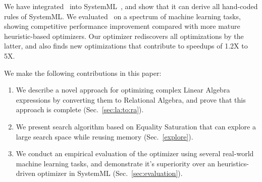 We have integrated \sys\ into
SystemML~\cite{DBLP:reference/bdt/Boehm19}, and show that it can
derive all hand-coded rules of SystemML.  We evaluated \sys\ on a
spectrum of machine learning tasks, showing competitive performance
improvement compared with more mature heuristic-based optimizers. Our
optimizer rediscovers all optimizations by the latter, and also finds
new optimizations that contribute to speedups of 1.2X to 5X.

We make the following contributions in this paper:
\begin{enumerate}
\item We describe a novel approach for optimizing complex Linear
  Algebra expressions by converting them to Relational Algebra, and
  prove that this approach is complete (Sec.~\ref{sec:la:to:ra}).
\item We present search algorithm based on Equality Saturation that
  can explore a large search space while reusing memory (Sec.~\ref{explore}).
\item We conduct an empirical evaluation of the optimizer using
  several real-world machine learning tasks, and demonstrate it's
  superiority over an heuristics-driven optimizer in SystemML
  (Sec.~\ref{sec:evaluation}).
\end{enumerate}{}

